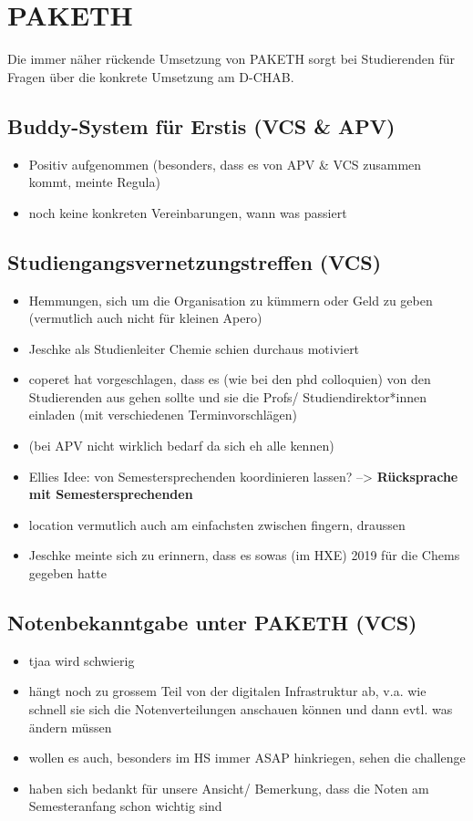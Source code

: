 \documentclass{article}
\begin{document}
\section{PAKETH}
Die immer näher rückende Umsetzung von PAKETH sorgt bei Studierenden für Fragen über die konkrete Umsetzung am D-CHAB.

\subsection{Buddy-System für Erstis (VCS \& APV)}
\begin{itemize}
    \item Positiv aufgenommen (besonders, dass es von APV \& VCS zusammen kommt, meinte Regula)
    \item noch keine konkreten Vereinbarungen, wann was passiert
\end{itemize}

\subsection{Studiengangsvernetzungstreffen (VCS)}
\begin{itemize}
    \item Hemmungen, sich um die Organisation zu kümmern oder Geld zu geben (vermutlich auch nicht für kleinen Apero)
    \item Jeschke als Studienleiter Chemie schien durchaus motiviert
    \item coperet hat vorgeschlagen, dass es (wie bei den phd colloquien) von den Studierenden aus gehen sollte und sie die Profs/ Studiendirektor*innen einladen (mit verschiedenen Terminvorschlägen)
    \item (bei APV nicht wirklich bedarf da sich eh alle kennen)
    \item Ellies Idee: von Semestersprechenden koordinieren lassen? --> \textbf{Rücksprache mit Semestersprechenden}
    \item location vermutlich auch am einfachsten zwischen fingern, draussen
    \item Jeschke meinte sich zu erinnern, dass es sowas (im HXE) 2019 für die Chems gegeben hatte
\end{itemize}

\subsection{Notenbekanntgabe unter PAKETH (VCS)}
\begin{itemize}
    \item tjaa wird schwierig
    \item hängt noch zu grossem Teil von der digitalen Infrastruktur ab, v.a. wie schnell sie sich die Notenverteilungen anschauen können und dann evtl. was ändern müssen
    \item wollen es auch, besonders im HS immer ASAP hinkriegen, sehen die challenge
    \item haben sich bedankt für unsere Ansicht/ Bemerkung, dass die Noten am Semesteranfang schon wichtig sind
\end{itemize}
\end{document}
